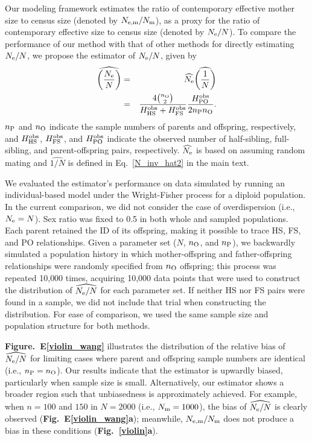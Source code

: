 \documentclass[12pt, English]{article}
\begin{document}
\begin{spacing}{1.9}
Our modeling framework estimates the ratio of contemporary effective mother size to census size (denoted by $N_{\rm e,m}/N_{\rm m}$), as a proxy for the ratio of contemporary effective size to census size (denoted by $N_{\rm e}/N$). To compare the performance of our method with that of other methods for directly estimating $N_{\rm e}/N$, we propose the estimator of $N_{\rm e}/N$, given by 
\begin{eqnarray}
\widehat{\left(\frac{N_{\rm e}}{N}\right) } &=& \widehat{N_{\rm e}}\widehat{\left(\frac{1}{N}\right)}\nonumber\\
&=& \frac{4\binom{n_{\rm O}}{2}}{H_{\rm HS}^{\rm obs}+H_{\rm FS}^{\rm obs}} \frac{H_{\rm PO}^{\rm obs} } {2n_{\rm P}n_{\rm O}}.
\label{NeN_wang}
\end{eqnarray}
$n_{\rm P}$ and $n_{\rm O}$ indicate the sample numbers of parents and offspring, respectively, and $H_{\rm HS}^{\rm obs}$, $H_{\rm FS}^{\rm obs}$, and $H_{\rm PO}^{\rm obs}$ indicate the observed number of half-sibling, full-sibling, and parent-offspring pairs, respectively. $\widehat{N_{\rm e}}$ is based on \cite{wang2009new} assuming random mating and $\widehat{1/N}$ is defined in Eq.~\ref{N_inv_hat2} in the main text.  

We evaluated the estimator's performance on data simulated by running an individual-based model under the Wright-Fisher process for a diploid population. In the current comparison, we did not consider the case of overdispersion (i.e., $N_{\rm e} = N$). Sex ratio was fixed to 0.5 in both whole and sampled populations. Each parent retained the ID of its offspring, making it possible to trace HS, FS, and PO relationships. Given a parameter set ($N$, $n_{\rm O}$, and $n_{\rm P}$), we backwardly simulated a population history in which  mother-offspring and father-offspring relationships were randomly specified from $n_{\rm O}$ offspring; this process was repeated 10{,}000 times, acquiring 10{,}000 data points that were used to construct the distribution of $\widehat{N_{\rm e}/N}$ for each parameter set. If neither HS nor FS pairs were found in a sample, we did not include that trial when constructing the distribution. For ease of comparison, we used the same sample size and population structure for both methods. 

{\bf Figure.~E\ref{violin_wang}} illustrates the distribution of the relative bias of $\widehat{N_{\rm e}/N}$ for limiting cases where parent and offspring sample numbers are identical (i.e., $n_{\rm P} = n_{\rm O}$). Our results indicate that the estimator is upwardly biased, particularly when sample size is small. Alternatively, our estimator shows a broader region such that unbiasedness is approximately achieved. For example, when $n = 100$ and $150$ in $N = 2000$ (i.e., $N_{\rm m}=1000$), the bias of $\widehat{N_{\rm e}/N}$ is clearly observed ({\bf Fig.~E\ref{violin_wang}a}); meanwhile, $N_{\rm e,m}/N_{\rm m}$ does not produce a bias in these conditions ({\bf Fig.~\ref{violin}a}).


\end{spacing}
\end{document}
